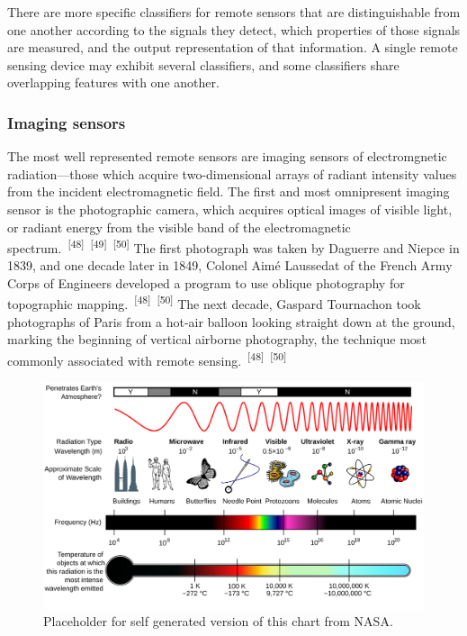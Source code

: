 \documentclass{article}
\begin{document}

\par{There are more specific classifiers for remote sensors that are distinguishable from one another according to the signals they detect, which properties of those signals are measured, and the output representation of that information. A single remote sensing device may exhibit several classifiers, and some classifiers share overlapping features with one another.}

\subsubsection{Imaging sensors}


\par{The most well represented remote sensors are imaging sensors of electromgnetic radiation---those which acquire two-dimensional arrays of radiant intensity values from the incident electromagnetic field. The first and most omnipresent imaging sensor is the photographic camera, which acquires optical images of visible light, or radiant energy from the visible band of the electromagnetic spectrum.~\textsuperscript{[48]}~\textsuperscript{[49]}~\textsuperscript{[50]} The first photograph was taken by Daguerre and Niepce in 1839, and one decade later in 1849, Colonel Aimé Laussedat of the French Army Corps of Engineers developed a program to use oblique photography for topographic mapping.~\textsuperscript{[48]}~\textsuperscript{[50]}  The next decade, Gaspard Tournachon took photographs of Paris from a hot-air balloon looking straight down at the ground, marking the beginning of vertical airborne photography, the technique most commonly associated with remote sensing.~\textsuperscript{[48]}~\textsuperscript{[50]}}


\begin{figure}
    \centering
    \includegraphics[width=1\linewidth]{images/em-spectrum.png}
    \caption{Placeholder for self generated version of this chart from NASA.}
    \label{figure12}
\end{figure}
\end{document}
